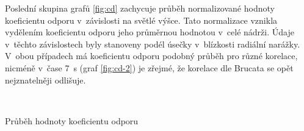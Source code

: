 Poslední skupina grafů \ref{fig:cd} zachycuje průběh normalizované hodnoty koeficientu odporu v~závislosti na světlé výšce. Tato normalizace vznikla vydělením koeficientu odporu jeho průměrnou hodnotou v~celé nádrži. Údaje v~těchto závislostech byly stanoveny podél úsečky v~blízkosti radiální narážky.  V~obou případech má  koeficientu odporu podobný průběh pro různé korelace, nicméně v~čase \SI{7}{\second} (graf \ref{fig:cd-2}) je zřejmé, že korelace dle Brucata se opět nejznatelněji odlišuje.

\begin{grf}[h!]
 \centering
  \\ 
  \caption{Průběh hodnoty koeficientu odporu}
  \label{fig:cd}
\end{grf}
\newpage

